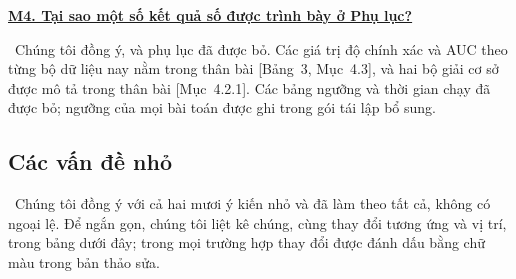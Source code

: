 \documentclass[11pt]{article}
\newcommand{\response}[1]{\smallskip\noindent{\color{blue!60!black}\textbf{Trả lời.}}\ #1\par\medskip}
\newcommand{\loc}[1]{\textcolor{blue!50!black}{[#1]}}
\newenvironment{point}[1]{\medskip\noindent\textbf{\uline{#1}}\par}{\par}
\begin{document}
\begin{point}{M4. Tại sao một số kết quả số được trình bày ở Phụ lục?}
\response{Chúng tôi đồng ý, và phụ lục đã được bỏ. Các giá trị độ chính xác và AUC theo từng bộ dữ liệu
nay nằm trong thân bài \loc{Bảng~3, Mục~4.3}, và hai bộ giải cơ sở được
mô tả trong thân bài \loc{Mục~4.2.1}. Các bảng ngưỡng và thời gian chạy đã được bỏ;
ngưỡng của mọi bài toán được ghi trong gói tái lập
bổ sung.}
\end{point}

\subsection*{Các vấn đề nhỏ}

\ Chúng tôi đồng ý với cả hai mươi ý kiến
nhỏ và đã làm theo tất cả, không có ngoại lệ. Để ngắn gọn, chúng tôi liệt kê
chúng, cùng thay đổi tương ứng và vị trí, trong bảng dưới đây; trong mọi trường hợp
thay đổi được đánh dấu bằng chữ màu trong bản thảo sửa.
\end{document}
